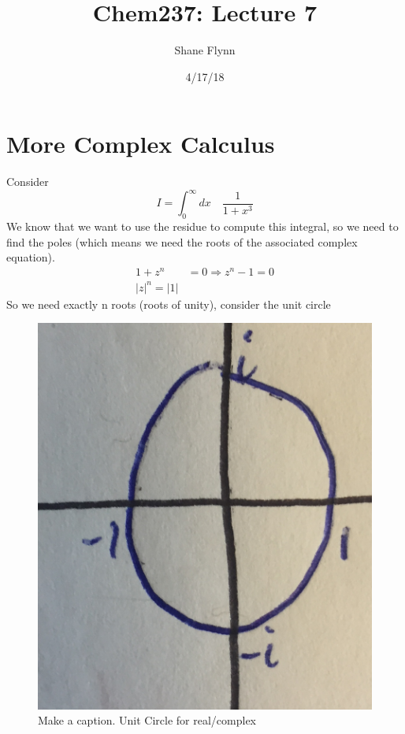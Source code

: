 \documentclass{article}
\title{Chem237: Lecture 7}
\date{4/17/18}
\author{Shane Flynn}
\newcommand{\be}{\begin{equation}}
\newcommand{\ee}{\end{equation}}
\begin{document}
\maketitle

\section*{More Complex Calculus}
Consider
\be
I = \int_0^\infty dx \quad \frac{1}{1+x^3}
\ee
We know that we want to use the residue to compute this integral, so we need to find the poles (which means we need the roots of the associated complex equation). 
\be
\begin{split}
    1 + z^n &= 0 \Rightarrow z^n - 1 = 0\\
    |z|^n = |1|
\end{split}
\ee
So we need exactly n roots (roots of unity), consider the unit circle 

\begin{figure}[H]
  \centering
    \includegraphics[scale=0.2]{Figures/unit.png}
    \caption{Make a caption. Unit Circle for real/complex}
\end{figure}
\end{document}
